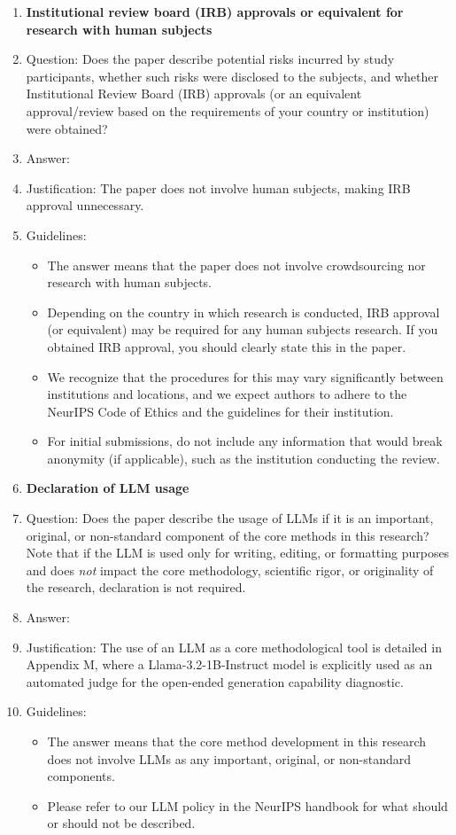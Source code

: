 \documentclass{article}
\begin{document}
\begin{enumerate}
\item {\bf Institutional review board (IRB) approvals or equivalent for research with human subjects}
    \item[] Question: Does the paper describe potential risks incurred by study participants, whether such risks were disclosed to the subjects, and whether Institutional Review Board (IRB) approvals (or an equivalent approval/review based on the requirements of your country or institution) were obtained?
    \item[] Answer: \answerNA{}
    \item[] Justification: The paper does not involve human subjects, making IRB approval unnecessary.
    \item[] Guidelines:
    \begin{itemize}
        \item The answer \answerNA{} means that the paper does not involve crowdsourcing nor research with human subjects.
        \item Depending on the country in which research is conducted, IRB approval (or equivalent) may be required for any human subjects research. If you obtained IRB approval, you should clearly state this in the paper. 
        \item We recognize that the procedures for this may vary significantly between institutions and locations, and we expect authors to adhere to the NeurIPS Code of Ethics and the guidelines for their institution. 
        \item For initial submissions, do not include any information that would break anonymity (if applicable), such as the institution conducting the review.
    \end{itemize}

\item {\bf Declaration of LLM usage}
    \item[] Question: Does the paper describe the usage of LLMs if it is an important, original, or non-standard component of the core methods in this research? Note that if the LLM is used only for writing, editing, or formatting purposes and does \emph{not} impact the core methodology, scientific rigor, or originality of the research, declaration is not required.
    \item[] Answer: \answerYes{}
    \item[] Justification: The use of an LLM as a core methodological tool is detailed in Appendix M, where a Llama-3.2-1B-Instruct model is explicitly used as an automated judge for the open-ended generation capability diagnostic.
    \item[] Guidelines:
    \begin{itemize}
        \item The answer \answerNA{} means that the core method development in this research does not involve LLMs as any important, original, or non-standard components.
        \item Please refer to our LLM policy in the NeurIPS handbook for what should or should not be described.
    \end{itemize}

\end{enumerate}
\end{document}
